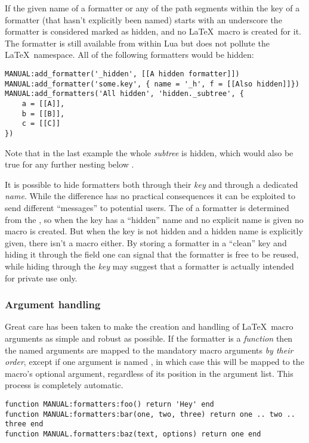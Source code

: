 \documentclass[12pt]{scrartcl}
\begin{document}
If the given name of a formatter or any of the path segments within the key
of a formatter (that hasn't explicitly been named) starts with an underscore the
formatter is considered marked as hidden, and no \LaTeX\ macro is created for
it.  The formatter is still available from within Lua but does not pollute the
\LaTeX\ namespace.  All of the following formatters would be hidden:

\begin{verbatim}
MANUAL:add_formatter('_hidden', [[A hidden formatter]])
MANUAL:add_formatter('some.key', { name = '_h', f = [[Also hidden]]})
MANUAL:add_formatters('All hidden', 'hidden._subtree', {
	a = [[A]],
	b = [[B]],
	c = [[C]]
})
\end{verbatim}

\noindent Note that in the last example the whole \emph{subtree} is hidden,
which would also be true for any further nesting below
.

It is possible to hide formatters both through their \emph{key} and through a
dedicated \emph{name}.  While the difference has no practical consequences it
can be exploited to send different “messages” to potential users.  The
 of a formatter is determined from the , so when the
key has a “hidden” name and no explicit name is given no macro is created. But
when the key is not hidden and a hidden name is explicitly given, there isn't a
macro either. By storing a formatter in a “clean” key and hiding it through the
 field one can signal that the formatter is free to be reused,
while hiding through the \emph{key} may suggest that a formatter is actually
intended for private use only.

\subsubsection{Argument handling}
\label{sec:usage-argument-handling}

Great care has been taken to make the creation and handling of \LaTeX\ macro
arguments as simple and robust as possible.  If the formatter is a
\emph{function} then the named arguments are mapped to the mandatory macro
arguments \emph{by their order}, except if one argument is named
, in which case this will be mapped to the macro's optional
argument, regardless of its position in the argument list. This process is
completely automatic.

\begin{verbatim}
function MANUAL:formatters:foo() return 'Hey' end
function MANUAL:formatters:bar(one, two, three) return one .. two .. three end
function MANUAL.formatters:baz(text, options) return one end
\end{verbatim}
\end{document}
